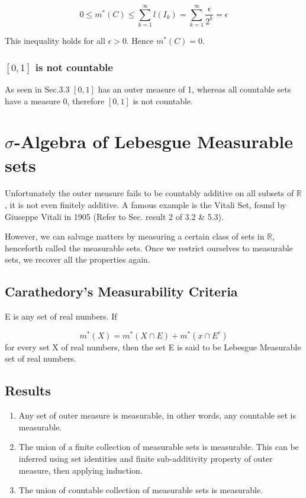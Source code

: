 \documentclass{article}
\begin{document}
$$ 0 \leq m^*(C) \leq \sum_{k=1}^{\infty}l(I_k) = \sum_{k=1}^{\infty} \frac{\epsilon}{2^k}= \epsilon$$

This inequality holds for all $\epsilon>0$. Hence $m^*(C)=0$.

\subsubsection{$[0,1]$ is not countable}

As seen in Sec.3.3 $[0,1]$ has an outer measure of 1, whereas all countable sets have a measure 0, therefore $[0,1]$ is not countable.
\newpage
\section{$\sigma$-Algebra of Lebesgue Measurable sets}

Unfortunately the outer measure fails to be countably additive on all subsets of $\mathbb{R}$, it is not even finitely additive. A famous example is the Vitali Set, found by Giuseppe Vitali in 1905 (Refer to Sec. result 2 of 3.2 \& 5.3).\smallskip

However, we can salvage matters by measuring a certain class of sets in $\mathbb{R}$, henceforth called the measurable sets. Once we restrict ourselves to measurable sets, we recover all the properties again.

\subsection{Carathedory's Measurability Criteria}

E is any set of real numbers. If

$$m^*(X)= m^*(X \cap E) + m^*(x \cap E^c) $$
for every set X of real numbers, then the set E is said to be Lebesgue Measurable set of real numbers.

\subsection{Results}
\begin{enumerate}
    \item Any set of outer measure is measurable, in other words, any countable set is measurable.
    \item The union of a finite collection of measurable sets is measurable. This can be inferred using set identities and finite sub-additivity property of outer measure, then applying induction.
    \item The union of countable collection of measurable sets is measurable.
\end{enumerate}
\end{document}
